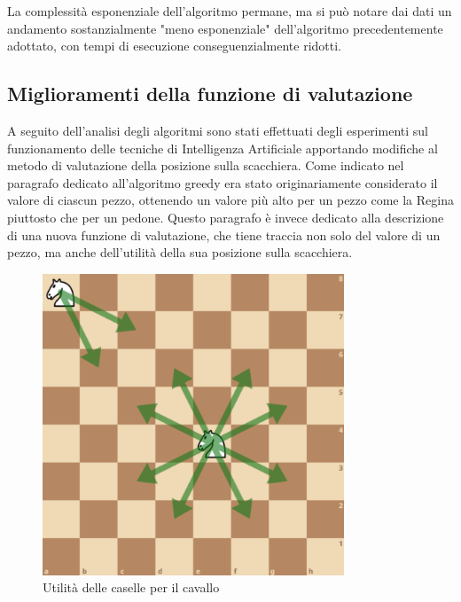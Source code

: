 La complessità esponenziale dell'algoritmo permane, ma si può notare dai dati un andamento sostanzialmente "meno esponenziale" dell'algoritmo precedentemente adottato, con tempi di esecuzione conseguenzialmente ridotti.

\subsection{Miglioramenti della funzione di valutazione}
A seguito dell'analisi degli algoritmi sono stati effettuati degli esperimenti sul funzionamento delle tecniche di Intelligenza Artificiale apportando modifiche al metodo di valutazione della posizione sulla scacchiera. Come indicato nel paragrafo dedicato all'algoritmo greedy era stato originariamente considerato il valore di ciascun pezzo, ottenendo un valore più alto per un pezzo come la Regina piuttosto che per un pedone. Questo paragrafo è invece dedicato alla descrizione di una nuova funzione di valutazione, che tiene traccia non solo del valore di un pezzo, ma anche dell'utilità della sua posizione sulla scacchiera.

\begin{figure}[!htb]
    \includegraphics[width=9cm]{frontmatter/figure/cavallo2.pdf}
    \centering
    \caption{Utilità delle caselle per il cavallo}
    \label{fig:valore_cavallo}
\end{figure}

